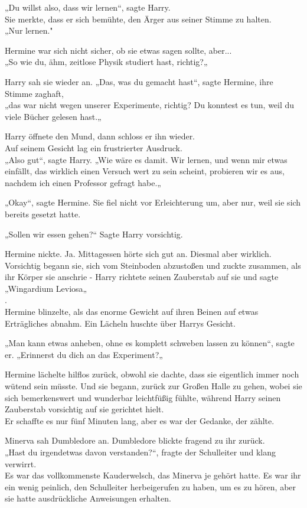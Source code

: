 {„Du willst also, dass wir lernen“, sagte Harry.\\ Sie merkte, dass er sich bemühte, den Ärger aus seiner Stimme zu halten.\\ „Nur lernen."

Hermine war sich nicht sicher, ob sie etwas sagen sollte, aber...\\ „So wie du, ähm, zeitlose Physik studiert hast, richtig?„

Harry sah sie wieder an. „Das, was du gemacht hast“, sagte Hermine, ihre Stimme zaghaft,\\ „das war nicht wegen unserer Experimente, richtig? Du konntest es tun, weil du viele Bücher gelesen hast.„

Harry öffnete den Mund, dann schloss er ihn wieder.\\ Auf seinem Gesicht lag ein frustrierter Ausdruck.\\ „Also gut“, sagte Harry. „Wie wäre es damit. Wir lernen, und wenn mir etwas einfällt, das wirklich einen Versuch wert zu sein scheint, probieren wir es aus, nachdem ich einen Professor gefragt habe.„

„Okay“, sagte Hermine. Sie fiel nicht vor Erleichterung um, aber nur, weil sie sich bereits gesetzt hatte.

„Sollen wir essen gehen?“ Sagte Harry vorsichtig.

Hermine nickte. Ja. Mittagessen hörte sich gut an. Diesmal aber wirklich. Vorsichtig begann sie, sich vom Steinboden abzustoßen und zuckte zusammen, als ihr Körper sie anschrie - Harry richtete seinen Zauberstab auf sie und sagte „Wingardium Leviosa„\\ .\\ Hermine blinzelte, als das enorme Gewicht auf ihren Beinen auf etwas Erträgliches abnahm. Ein Lächeln huschte über Harrys Gesicht.

„Man kann etwas anheben, ohne es komplett schweben lassen zu können“, sagte er. „Erinnerst du dich an das Experiment?„

Hermine lächelte hilflos zurück, obwohl sie dachte, dass sie eigentlich immer noch wütend sein müsste. Und sie begann, zurück zur Großen Halle zu gehen, wobei sie sich bemerkenswert und wunderbar leichtfüßig fühlte, während Harry seinen Zauberstab vorsichtig auf sie gerichtet hielt.\\ Er schaffte es nur fünf Minuten lang, aber es war der Gedanke, der zählte.

Minerva sah Dumbledore an. Dumbledore blickte fragend zu ihr zurück.\\ „Hast du irgendetwas davon verstanden?“, fragte der Schulleiter und klang verwirrt.\\ Es war das vollkommenste Kauderwelsch, das Minerva je gehört hatte. Es war ihr ein wenig peinlich, den Schulleiter herbeigerufen zu haben, um es zu hören, aber sie hatte ausdrückliche Anweisungen erhalten.

}
